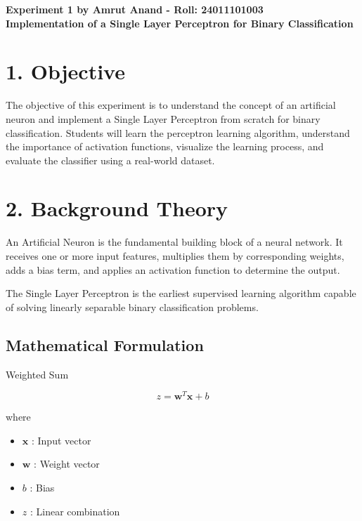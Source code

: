 \documentclass[11pt]{article}
\begin{document}
\begin{center}
\Large\textbf{Experiment 1 by Amrut Anand - Roll: 24011101003}\\
\vspace{0.2cm}
\large\textbf{Implementation of a Single Layer Perceptron for Binary Classification}
\end{center}


\section*{1. Objective}

The objective of this experiment is to understand the concept of an artificial neuron and implement a Single Layer Perceptron from scratch for binary classification. Students will learn the perceptron learning algorithm, understand the importance of activation functions, visualize the learning process, and evaluate the classifier using a real-world dataset.


\section*{2. Background Theory}

An Artificial Neuron is the fundamental building block of a neural network. It receives one or more input features, multiplies them by corresponding weights, adds a bias term, and applies an activation function to determine the output.

The Single Layer Perceptron is the earliest supervised learning algorithm capable of solving linearly separable binary classification problems.

\subsection*{Mathematical Formulation}

Weighted Sum

\[
z=\mathbf{w}^{T}\mathbf{x}+b
\]

where

\begin{itemize}
\item $\mathbf{x}$ : Input vector
\item $\mathbf{w}$ : Weight vector
\item $b$ : Bias
\item $z$ : Linear combination
\end{itemize}
\end{document}
